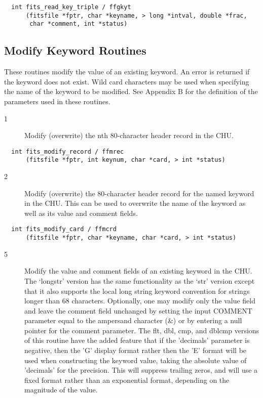 \documentclass[11pt]{book}
\begin{document}
\begin{verbatim}
  int fits_read_key_triple / ffgkyt
      (fitsfile *fptr, char *keyname, > long *intval, double *frac,
       char *comment, int *status)
\end{verbatim}

\subsection{Modify Keyword Routines}

These routines modify the value of an existing keyword.  An error is
returned if the keyword does not exist.  Wild card characters may be
used when specifying the name of the keyword to be modified.  See
Appendix B for the definition of the parameters used in these
routines.


\begin{description}
\item[1 ] Modify (overwrite) the nth 80-character header record in the CHU. \label{ffmrec}
\end{description}

\begin{verbatim}
  int fits_modify_record / ffmrec
      (fitsfile *fptr, int keynum, char *card, > int *status)
\end{verbatim}

\begin{description}
\item[2 ] Modify (overwrite) the 80-character header record for the named keyword
    in the CHU.  This can be used to overwrite the name of the keyword as
   well as its value and comment fields. \label{ffmcrd}
\end{description}

\begin{verbatim}
  int fits_modify_card / ffmcrd
      (fitsfile *fptr, char *keyname, char *card, > int *status)
\end{verbatim}

\begin{description}
\item[5 ] Modify the value and comment fields of an existing keyword in the CHU.
    The `longstr' version has the same functionality as the `str'
    version except that it also supports the local long string keyword
    convention for strings longer than 68 characters.  Optionally, one
    may modify only the value field and leave the comment field
    unchanged by setting the input COMMENT parameter equal to the
    ampersand character (\&) or by entering a null pointer for the
    comment parameter.  The flt, dbl, cmp, and dblcmp versions of this
    routine have the added feature that if the 'decimals' parameter is
    negative, then the 'G' display format rather then the 'E' format
    will be used when constructing the keyword value, taking the
    absolute value of 'decimals' for the precision.  This will suppress
    trailing zeros, and will use a fixed format rather than an
    exponential format,
   depending on the magnitude of the value. \label{ffmkyx}
\end{description}
\end{document}
